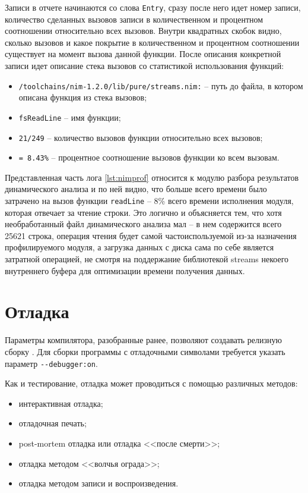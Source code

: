 Записи в отчете начинаются со слова \verb|Entry|, сразу после него идет номер
записи, количество сделанных вызовов записи в количественном и процентном
соотношении относительно всех вызовов. Внутри квадратных скобок видно, сколько
вызовов и какое покрытие в количественном и процентном соотношении существует на
момент вызова данной функции.
После описания конкретной записи идет описание стека вызовов со статистикой использования 
функций:
\begin{itemize}
    \item \verb|/toolchains/nim-1.2.0/lib/pure/streams.nim:| -- путь до файла, в котором 
        описана функция из стека вызовов;
    \item \verb|fsReadLine| -- имя функции;
    \item \verb|21/249| -- количество вызовов функции относительно всех вызовов;
    \item \verb|= 8.43%| -- процентное соотношение вызовов функции ко всем вызовам.
\end{itemize}

Представленная часть лога \autoref{lst:nimprof} относится к модулю разбора результатов
динамического анализа и по ней видно, что больше всего времени было затрачено на вызов 
функции \verb|readLine| -- 8\% всего времени исполнения модуля,
которая отвечает за чтение строки.
Это логично и объясняется тем, что хотя необработанный файл динамического анализа мал --
в нем содержится всего 25621 строка, операция чтения будет самой частоиспользуемой
из-за назначения профилируемого модуля, а загрузка данных с диска сама по себе
является затратной операцией, не смотря на поддержание библиотекой streams некоего
внутреннего буфера для оптимизации времени получения данных. 

\section{Отладка {\ProgModule}}\label{sec:ch3/sec1/sub4}
Параметры компилятора, разобранные ранее, 
позволяют создавать релизную сборку {\ProgModule}.
Для сборки программы с отладочными символами требуется 
указать параметр \verb|--debugger:on|.

Как и тестирование, отладка может проводиться с помощью
различных методов:
\begin{itemize}
    \item интерактивная отладка;
    \item отладочная печать;
    \item post-mortem отладка или отладка <<после смерти>>;
    \item отладка методом <<волчья ограда>>;
    \item отладка методом записи и воспроизведения.
\end{itemize}

